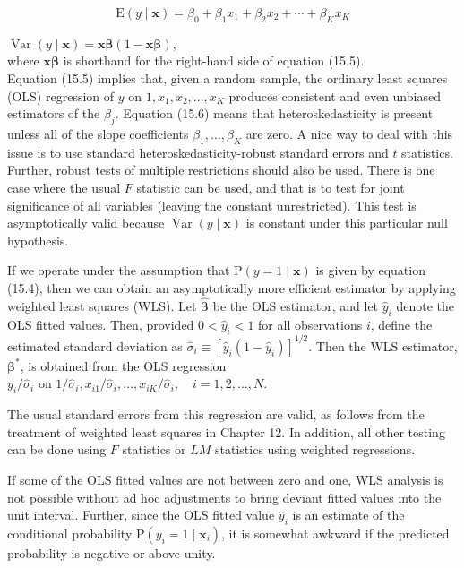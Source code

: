 \documentclass[10pt]{article}
\begin{document}
\begin{equation*}
\mathrm{E}(y \mid \mathbf{x})=\beta_{0}+\beta_{1} x_{1}+\beta_{2} x_{2}+\cdots+\beta_{K} x_{K} \tag{15.5}
\end{equation*}


$\operatorname{Var}(y \mid \mathbf{x})=\mathbf{x} \boldsymbol{\beta}(1-\mathbf{x} \boldsymbol{\beta})$,\\
where $\mathbf{x} \boldsymbol{\beta}$ is shorthand for the right-hand side of equation (15.5).\\
Equation (15.5) implies that, given a random sample, the ordinary least squares (OLS) regression of $y$ on $1, x_{1}, x_{2}, \ldots, x_{K}$ produces consistent and even unbiased estimators of the $\beta_{j}$. Equation (15.6) means that heteroskedasticity is present unless all of the slope coefficients $\beta_{1}, \ldots, \beta_{K}$ are zero. A nice way to deal with this issue is to use standard heteroskedasticity-robust standard errors and $t$ statistics. Further, robust tests of multiple restrictions should also be used. There is one case where the usual $F$ statistic can be used, and that is to test for joint significance of all variables (leaving the constant unrestricted). This test is asymptotically valid because $\operatorname{Var}(y \mid \mathbf{x})$ is constant under this particular null hypothesis.

If we operate under the assumption that $\mathrm{P}(y=1 \mid \mathbf{x})$ is given by equation (15.4), then we can obtain an asymptotically more efficient estimator by applying weighted least squares (WLS). Let $\hat{\boldsymbol{\beta}}$ be the OLS estimator, and let $\hat{y}_{i}$ denote the OLS fitted values. Then, provided $0<\hat{y}_{i}<1$ for all observations $i$, define the estimated standard deviation as $\hat{\sigma}_{i} \equiv\left[\hat{y}_{i}\left(1-\hat{y}_{i}\right)\right]^{1 / 2}$. Then the WLS estimator, $\boldsymbol{\beta}^{*}$, is obtained from the OLS regression\\
$y_{i} / \hat{\sigma}_{i}$ on $1 / \hat{\sigma}_{i}, x_{i 1} / \hat{\sigma}_{i}, \ldots, x_{i K} / \hat{\sigma}_{i}, \quad i=1,2, \ldots, N$.

The usual standard errors from this regression are valid, as follows from the treatment of weighted least squares in Chapter 12. In addition, all other testing can be done using $F$ statistics or $L M$ statistics using weighted regressions.

If some of the OLS fitted values are not between zero and one, WLS analysis is not possible without ad hoc adjustments to bring deviant fitted values into the unit interval. Further, since the OLS fitted value $\hat{y}_{i}$ is an estimate of the conditional probability $\mathrm{P}\left(y_{i}=1 \mid \mathbf{x}_{i}\right)$, it is somewhat awkward if the predicted probability is negative or above unity.
\end{document}
